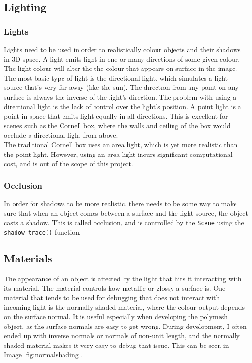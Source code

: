 \documentclass[a4paper]{article}
\begin{document}
\subsection{Lighting}
\subsubsection{Lights}
Lights need to be used in order to realistically colour objects and their shadows in 3D space. A light emits light in one or many directions of some given colour. The light colour will alter the the colour that appears on surface in the image.\\

The most basic type of light is the directional light, which simulates a light source that's very far away (like the sun). The direction from any point on any surface is always the inverse of the light's direction. The problem with using a directional light is the lack of control over the light's position. A point light is a point in space that emits light equally in all directions. This is excellent for scenes such as the Cornell box, where the walls and ceiling of the box would occlude a directional light from above.\\

The traditional Cornell box uses an area light, which is yet more realistic than the point light. However, using an area light incurs significant computational cost, and is out of the scope of this project.\\

\subsubsection{Occlusion}
In order for shadows to be more realistic, there needs to be some way to make sure that when an object comes between a surface and the light source, the object casts a shadow. This is called occlusion, and is controlled by the \texttt{Scene} using the \texttt{shadow\_trace()} function.\\

\subsection{Materials}
The appearance of an object is affected by the light that hits it interacting with its material. The material controls how metallic or glossy a surface is. One material that tends to be used for debugging that does not interact with incoming light is the normally shaded material, where the colour output depends on the surface normal. It is useful especially when developing the polymesh object, as the surface normals are easy to get wrong. During development, I often ended up with inverse normals or normals of non-unit length, and the normally shaded material makes it very easy to debug that issue. This can be seen in Image \ref{fig:normalshading}.\\
\end{document}
